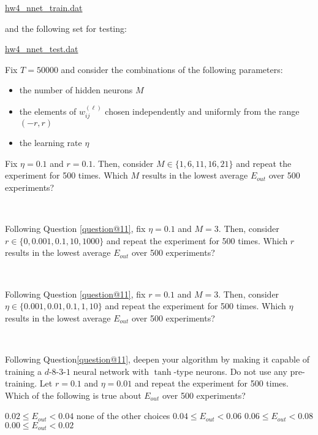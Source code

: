 \documentclass[a4paper,10pt]{exam}
\begin{document}
\begin{questions}
	\href{https://d396qusza40orc.cloudfront.net/ntumltwo/hw4_data/hw4_nnet_train.dat}{hw4\_nnet\_train.dat}

	and the following set for testing:

	\href{https://d396qusza40orc.cloudfront.net/ntumltwo/hw4_data/hw4_nnet_test.dat}{hw4\_nnet\_test.dat}

	Fix $T=50000$ and consider the combinations of the following parameters:

	\begin{itemize}
		\item the number of hidden neurons $M$
		\item the elements of $w_{ij}^{(\ell)}$ chosen independently and uniformly from the range $(-r, r)$
		\item the learning rate $\eta$
	\end{itemize}
	Fix $\eta = 0.1$ and $r = 0.1$. Then, consider $M \in \{1, 6, 11, 16, 21\}$ and repeat the experiment for 500 times. Which $M$ results in the lowest average $E_{out}$ over 500 experiments?
	\begin{checkboxes}
		\\
	\end{checkboxes}

	\question Following Question \ref{question@11}, fix $\eta = 0.1$ and $M=3$. Then, consider $r \in \{0, 0.001, 0.1, 10, 1000\}$ and repeat the experiment for 500 times. Which $r$ results in the lowest average $E_{out}$ over 500 experiments?
	\begin{checkboxes}
		\choice 0
		\CorrectChoice 0.1
		\choice 0.001
		\choice 10
		\choice 1000\\
	\end{checkboxes}

	\question Following Question \ref{question@11}, fix $r=0.1$ and $M=3$. Then, consider $\eta \in \{0.001, 0.01, 0.1, 1, 10\}$ and repeat the experiment for 500 times. Which $\eta$ results in the lowest average $E_{out}$ over 500 experiments?
	\begin{checkboxes}
		\CorrectChoice 0.01
		.001
		\choice 0.1
		\choice 1\\
	\end{checkboxes}

	\question Following Question\ref{question@11}, deepen your algorithm by making it capable of training a $d$-$8$-$3$-$1$ neural network with $\tanh$-type neurons. Do not use any pre-training. Let $r=0.1$ and $\eta = 0.01$ and repeat the experiment for 500 times. Which of the following is true about $E_{out}$ over 500 experiments?
	\begin{checkboxes}
		\CorrectChoice $0.02 \leq E_{out} < 0.04$
		\choice none of the other choices
		\choice $0.04 \leq E_{out} < 0.06$
		\choice $0.06 \leq E_{out} < 0.08$
		\choice $0.00 \leq E_{out} < 0.02$\\
	\end{checkboxes}


\end{questions}
\end{document}

